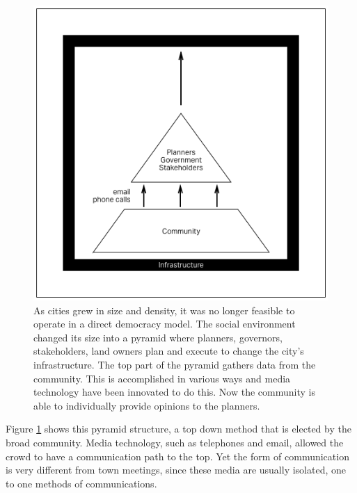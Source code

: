 \begin{figure}[!htb]
  \includegraphics[width=\textwidth]{chapters/2/fig/opinion.png}               
  \caption[representative democracy]{
  As cities grew in size and density, it was no longer feasible to operate in a direct democracy model.
  The social environment changed its size into a pyramid where planners, governors, stakeholders,
  land owners plan and execute to change the city's infrastructure.
  The top part of the pyramid gathers data from the community.
  This is accomplished in various ways and media technology have been innovated to do this.
  Now the community is able to individually provide opinions to the planners.
  }
  \label{fig:diagarm_opinion}
\end{figure}

Figure \ref{fig:diagarm_opinion} shows this pyramid structure, a top down method that is elected by the broad community. Media technology, such as telephones and email, allowed the crowd to have a communication path to the top. Yet the form of communication is very different from town meetings, since these media are usually isolated, one to one methods of communications.

